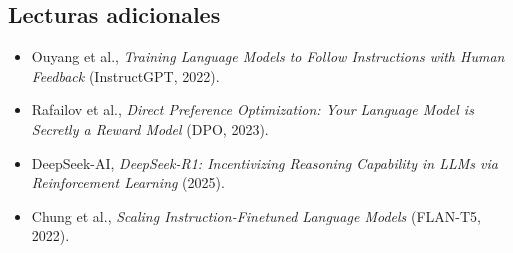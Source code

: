 \documentclass[a4paper]{article}
\begin{document}
\subsection{Lecturas adicionales}
\begin{itemize}
    \item Ouyang et al., \textit{Training Language Models to Follow Instructions with Human Feedback} (InstructGPT, 2022).
    \item Rafailov et al., \textit{Direct Preference Optimization: Your Language Model is Secretly a Reward Model} (DPO, 2023).
    \item DeepSeek-AI, \textit{DeepSeek-R1: Incentivizing Reasoning Capability in LLMs via Reinforcement Learning} (2025).
    \item Chung et al., \textit{Scaling Instruction-Finetuned Language Models} (FLAN-T5, 2022).
\end{itemize}
\end{document}
